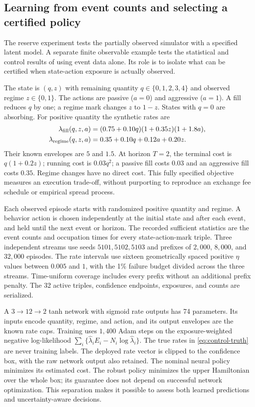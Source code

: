 \subsection{Learning from event counts and selecting a certified policy}
The reserve experiment tests the partially observed simulator with a specified latent model. A separate finite observable example tests the statistical and control results of  using event data alone. Its role is to isolate what can be certified when state-action exposure is actually observed.

The state is $(q,z)$ with remaining quantity $q\in\{0,1,2,3,4\}$ and observed regime $z\in\{0,1\}$. The actions are passive ($a=0$) and aggressive ($a=1$). A fill reduces $q$ by one; a regime mark changes $z$ to $1-z$. States with $q=0$ are absorbing. For positive quantity the synthetic rates are
\begin{align}\label{eq:control-truth}
 \lambda_{\rm fill}(q,z,a)&=(0.75+0.10q)(1+0.35z)(1+1.8a),\\
 \lambda_{\rm regime}(q,z,a)&=0.35+0.10q+0.12a+0.20z.\notag
\end{align}
Their known envelopes are $5$ and $1.5$. At horizon $T=2$, the terminal cost is $q(1+0.2z)$; running cost is $0.03q^2$; a passive fill costs $0.03$ and an aggressive fill costs $0.35$. Regime changes have no direct cost. This fully specified objective measures an execution trade-off, without purporting to reproduce an exchange fee schedule or empirical spread process.

Each observed episode starts with randomized positive quantity and regime. A behavior action is chosen independently at the initial state and after each event, and held until the next event or horizon. The recorded sufficient statistics are the event counts and occupation times for every state-action-mark triple. Three independent streams use seeds $5101,5102,5103$ and prefixes of $2{,}000$, $8{,}000$, and $32{,}000$ episodes. The rate intervals use sixteen geometrically spaced positive $\eta$ values between $0.005$ and $1$, with the 1\% failure budget divided across the three streams. Time-uniform coverage includes every prefix without an additional prefix penalty. The 32 active triples, confidence endpoints, exposures, and counts are serialized.

A $3\to12\to2$ tanh network with sigmoid rate outputs has 74 parameters. Its inputs encode quantity, regime, and action, and its output envelopes are the known rate caps. Training uses $1{,}400$ Adam steps on the exposure-weighted negative log-likelihood
$\sum_i\{\widehat\lambda_i E_i-N_i\log\widehat\lambda_i\}$.
The true rates in \eqref{eq:control-truth} are never training labels. The deployed rate vector is clipped to the confidence box, with the raw network output also retained. The nominal neural policy minimizes its estimated cost. The robust policy minimizes the upper Hamiltonian over the whole box; its guarantee does not depend on successful network optimization. This separation makes it possible to assess both learned predictions and uncertainty-aware decisions.

